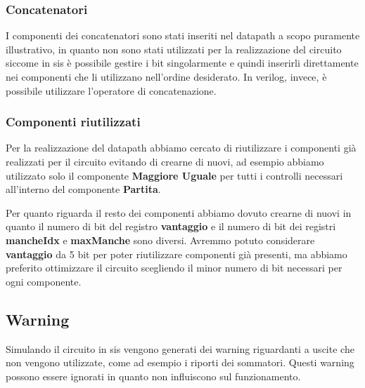 \documentclass[a4paper]{article}
\begin{document}
\subsubsection{Concatenatori}
I componenti dei concatenatori sono stati inseriti nel datapath a scopo puramente illustrativo, in quanto
non sono stati utilizzati per la realizzazione del circuito siccome in sis è possibile gestire i bit singolarmente
e quindi inserirli direttamente nei componenti che li utilizzano nell'ordine desiderato. In verilog, invece,
è possibile utilizzare l'operatore di concatenazione.

\subsubsection{Componenti riutilizzati}
Per la realizzazione del datapath abbiamo cercato di riutilizzare i componenti già realizzati per il circuito
evitando di crearne di nuovi, ad esempio abbiamo utilizzato solo il componente \textbf{Maggiore Uguale} per 
tutti i controlli necessari all'interno del componente \textbf{Partita}.

\noindent Per quanto riguarda il resto dei componenti abbiamo dovuto crearne di nuovi in quanto il numero di
bit del registro \textbf{vantaggio} e il numero di bit dei registri \textbf{mancheIdx} e \textbf{maxManche}
sono diversi. Avremmo potuto considerare \textbf{vantaggio} da 5 bit per poter riutilizzare componenti già presenti,
ma abbiamo preferito ottimizzare il circuito scegliendo il minor numero di bit necessari per ogni componente.

\subsection{Warning}
Simulando il circuito in sis vengono generati dei warning riguardanti a uscite che non vengono utilizzate, come
ad esempio i riporti dei sommatori. Questi warning possono essere ignorati in quanto non influiscono sul funzionamento.
\end{document}

